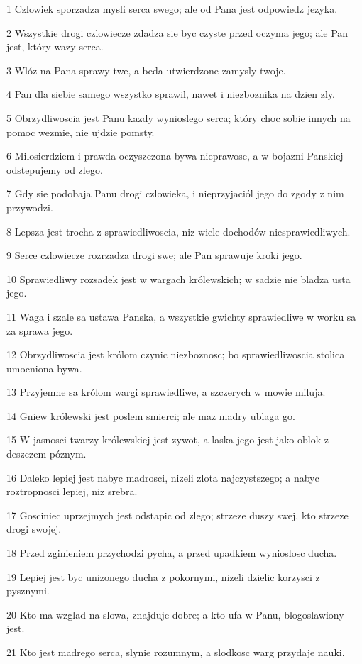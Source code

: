 \par 1 Czlowiek sporzadza mysli serca swego; ale od Pana jest odpowiedz jezyka.
\par 2 Wszystkie drogi czlowiecze zdadza sie byc czyste przed oczyma jego; ale Pan jest, który wazy serca.
\par 3 Wlóz na Pana sprawy twe, a beda utwierdzone zamysly twoje.
\par 4 Pan dla siebie samego wszystko sprawil, nawet i niezboznika na dzien zly.
\par 5 Obrzydliwoscia jest Panu kazdy wynioslego serca; który choc sobie innych na pomoc wezmie, nie ujdzie pomsty.
\par 6 Milosierdziem i prawda oczyszczona bywa nieprawosc, a w bojazni Panskiej odstepujemy od zlego.
\par 7 Gdy sie podobaja Panu drogi czlowieka, i nieprzyjaciól jego do zgody z nim przywodzi.
\par 8 Lepsza jest trocha z sprawiedliwoscia, niz wiele dochodów niesprawiedliwych.
\par 9 Serce czlowiecze rozrzadza drogi swe; ale Pan sprawuje kroki jego.
\par 10 Sprawiedliwy rozsadek jest w wargach królewskich; w sadzie nie bladza usta jego.
\par 11 Waga i szale sa ustawa Panska, a wszystkie gwichty sprawiedliwe w worku sa za sprawa jego.
\par 12 Obrzydliwoscia jest królom czynic niezboznosc; bo sprawiedliwoscia stolica umocniona bywa.
\par 13 Przyjemne sa królom wargi sprawiedliwe, a szczerych w mowie miluja.
\par 14 Gniew królewski jest poslem smierci; ale maz madry ublaga go.
\par 15 W jasnosci twarzy królewskiej jest zywot, a laska jego jest jako oblok z deszczem póznym.
\par 16 Daleko lepiej jest nabyc madrosci, nizeli zlota najczystszego; a nabyc roztropnosci lepiej, niz srebra.
\par 17 Gosciniec uprzejmych jest odstapic od zlego; strzeze duszy swej, kto strzeze drogi swojej.
\par 18 Przed zginieniem przychodzi pycha, a przed upadkiem wynioslosc ducha.
\par 19 Lepiej jest byc unizonego ducha z pokornymi, nizeli dzielic korzysci z pysznymi.
\par 20 Kto ma wzglad na slowa, znajduje dobre; a kto ufa w Panu, blogoslawiony jest.
\par 21 Kto jest madrego serca, slynie rozumnym, a slodkosc warg przydaje nauki.
